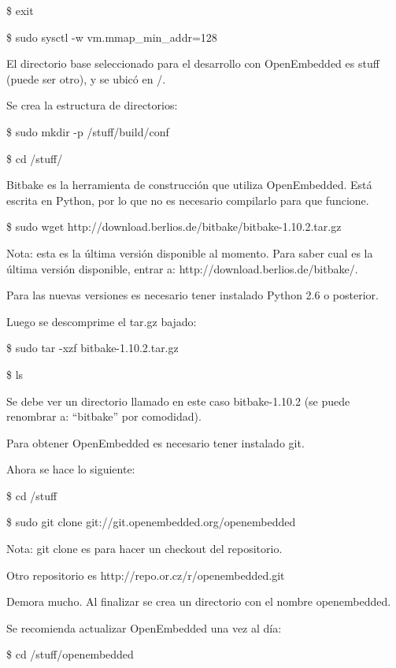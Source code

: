 \centerline{\$ exit}

\centerline{\$ sudo sysctl -w vm.mmap\_min\_addr=128}



\bigskip
El directorio base seleccionado para el desarrollo con OpenEmbedded es stuff (puede ser otro), y se ubicó en /.

\bigskip
Se crea la estructura de directorios:

\bigskip
\centerline{\$ sudo mkdir -p /stuff/build/conf}

\centerline{\$ cd /stuff/}

\bigskip
Bitbake es la herramienta de construcción que utiliza OpenEmbedded. Está escrita en Python, por lo que no es necesario compilarlo para que funcione.

\bigskip
\centerline{\$ sudo wget http://download.berlios.de/bitbake/bitbake-1.10.2.tar.gz}

\bigskip
Nota: esta es la última versión disponible al momento. Para saber cual es la última versión disponible, entrar a: http://download.berlios.de/bitbake/.

Para las nuevas versiones es necesario tener instalado Python 2.6 o posterior.

\newpage
Luego se descomprime el tar.gz bajado:

\bigskip
\centerline{\$ sudo tar -xzf bitbake-1.10.2.tar.gz}

\centerline{\$ ls}

\bigskip
Se debe ver un directorio llamado en este caso bitbake-1.10.2 (se puede renombrar a: “bitbake” por comodidad).

\bigskip
Para obtener OpenEmbedded es necesario tener instalado git.

\bigskip
Ahora se hace lo siguiente:

\bigskip
\centerline{\$ cd /stuff}

\centerline{\$ sudo git clone git://git.openembedded.org/openembedded}

\bigskip
Nota: git clone es para hacer un checkout del repositorio. 

Otro repositorio es http://repo.or.cz/r/openembedded.git

\bigskip
Demora mucho. Al finalizar se crea un directorio con el nombre openembedded.

\bigskip
Se recomienda actualizar OpenEmbedded una vez al día:

\bigskip
\centerline{\$ cd /stuff/openembedded}

